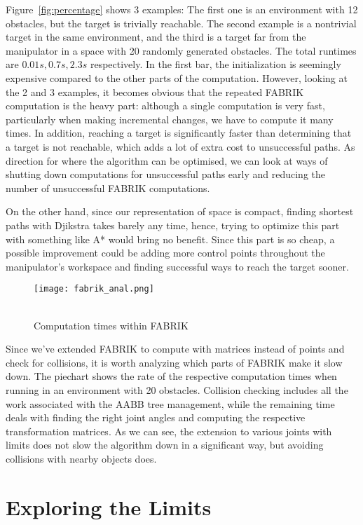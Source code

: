 Figure~\ref{fig:percentage} shows 3 examples: The first one is an environment with 12 obstacles, but the target is trivially reachable. The second example is a nontrivial target in the same environment, and the third is a target far from the manipulator in a space with 20 randomly generated obstacles. The total runtimes are $0.01s, 0.7s, 2.3s$ respectively. In the first bar, the initialization is seemingly expensive compared to the other parts of the computation. However, looking at the 2\nd{} and 3\rd{} examples, it becomes obvious that the repeated FABRIK computation is the heavy part: although a single computation is very fast, particularly when making incremental changes, we have to compute it many times. In addition, reaching a target is significantly faster than determining that a target is not reachable, which adds a lot of extra cost to unsuccessful paths. As direction for where the algorithm can be optimised, we can look at ways of shutting down computations for unsuccessful paths early and reducing the number of unsuccessful FABRIK computations.

On the other hand, since our representation of space is compact, finding shortest paths with Djikstra takes barely any time, hence, trying to optimize this part with something like A* would bring no benefit. Since this part is so cheap, a possible improvement could be adding more control points throughout the manipulator's workspace and finding successful ways to reach the target sooner.

\begin{wrapfigure}{l}{0.4\textwidth}
  \centering
  \texttt{[image: fabrik\_anal.png]}
  \caption{\\Computation times within FABRIK}
\end{wrapfigure}

Since we've extended FABRIK to compute with matrices instead of points and check for collisions, it is worth analyzing which parts of FABRIK make it slow down. The piechart shows the rate of the respective computation times when running in an environment with 20 obstacles. Collision checking includes all the work associated with the AABB tree management, while the remaining time deals with finding the right joint angles and computing the respective transformation matrices. As we can see, the extension to various joints with limits does not slow the algorithm down in a significant way, but avoiding collisions with nearby objects does.

\section{Exploring the Limits}

